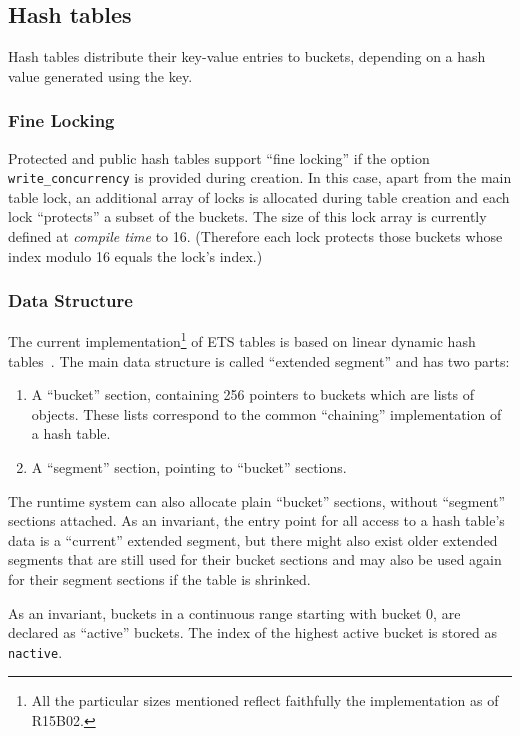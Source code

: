 \documentclass[aps,pre,preprint,nofootinbib]{revtex4}
\begin{document}
\subsection{Hash tables}

Hash tables distribute their key-value entries to buckets, depending on a hash value generated using the key.

\subsubsection{Fine Locking}

Protected and public hash tables support ``fine locking'' if the option \verb|write_concurrency| is provided during creation.
In this case, apart from the main table lock, an additional array of locks is allocated during table creation and each lock ``protects'' a subset of the buckets.
The size of this lock array is currently defined at \emph{compile time} to 16.
(Therefore each lock protects those buckets whose index modulo 16 equals the lock's index.)

\subsubsection{Data Structure}

The current implementation\footnote{All the particular sizes mentioned reflect faithfully the implementation as of R15B02.} of ETS tables is based on linear dynamic hash tables~\cite{Larson}.
The main data structure is called ``extended segment'' and has two parts:
\begin{enumerate}
  \item A ``bucket'' section, containing 256 pointers to buckets which are lists of objects.
    These lists correspond to the common ``chaining'' implementation of a hash table.
  \item A ``segment'' section, pointing to ``bucket'' sections.
\end{enumerate}
The runtime system can also allocate plain ``bucket'' sections, without ``segment'' sections attached.
As an invariant, the entry point for all access to a hash table's data is a ``current'' extended segment, but there might also exist older extended segments that are still used for their bucket sections and may also be used again for their segment sections if the table is shrinked.

As an invariant, buckets in a continuous range starting with bucket 0, are declared as ``active'' buckets.
The index of the highest active bucket is stored as \verb|nactive|.
\end{document}
